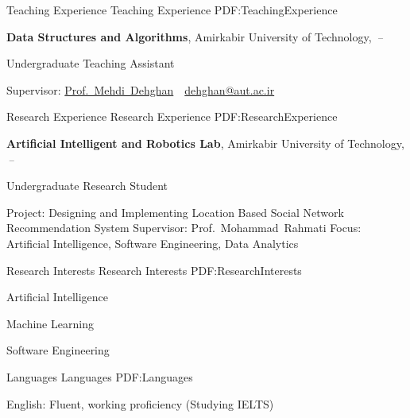 \documentclass[letterpaper,MMMyyyy,nonstopmode]{resume}
\begin{document}
\begin{Body}


\Section
{Teaching Experience}
{Teaching Experience}
{PDF:TeachingExperience}

\Entry
\textbf{Data Structures and Algorithms},
Amirkabir University of Technology,
\hfill
\textsl{\small{\,--\,}}

\Gap
\BulletItem
Undergraduate Teaching Assistant
\begin{Detail}
\SubBulletItem
Supervisor:
\href{https://aut.ac.ir/cv/2123/Mehdi-Dehghan-Takht-Fooladi?slc_lang=en&&cv=2123&mod=scv}
{Prof.~Mehdi~Dehghan}
\,\SubBulletSymbol\,
\href{mailto:dehghan@aut.ac.ir}
{dehghan@aut.ac.ir}
\end{Detail}


\Section
{Research Experience}
{Research Experience}
{PDF:ResearchExperience}

\Entry
\textbf{Artificial Intelligent and Robotics Lab},
Amirkabir University of Technology,
\hfill
\textsl{\small{\,--\,}}

\Gap
\BulletItem
Undergraduate Research Student
\begin{Detail}
\SubBulletItem
Project:
Designing and Implementing Location Based Social Network Recommendation System
\SubBulletItem
Supervisor:
Prof.~Mohammad~Rahmati
\SubBulletItem
Focus: Artificial Intelligence, Software Engineering, Data Analytics
\end{Detail}


\Section
{Research Interests}
{Research Interests}
{PDF:ResearchInterests}

\BulletItem
Artificial Intelligence

\Gap
\BulletItem
Machine Learning

\Gap
\BulletItem
Software Engineering


\Section
{Languages}
{Languages}
{PDF:Languages}

\BulletItem
English: Fluent, working proficiency (Studying IELTS)


\end{Body}
\end{document}
